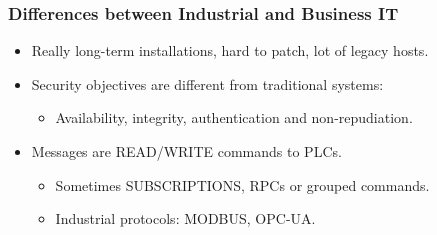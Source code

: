 \documentclass{beamer}
\newcommand{\cybersec}{cybersecurity\xspace}
\newcommand{\modbus}{MODBUS\xspace}
\newcommand{\opcua}{OPC-UA\xspace}
\begin{document}
\begin{frame}
    \frametitle{Differences between Industrial and Business IT}
    
    \begin{itemize}
        \item Really long-term installations, hard to patch, lot of legacy hosts.
            \vfill
        \item Security objectives are different from traditional systems:
        \begin{itemize}
            \item Availability, integrity, authentication and non-repudiation.%
        \end{itemize}
            \vfill
        \item Messages are READ/WRITE commands to PLCs.
        \begin{itemize}
            \item Sometimes SUBSCRIPTIONS, RPCs or grouped commands.
            \item Industrial protocols: \modbus, \opcua.
        \end{itemize}
    \end{itemize}
\end{frame}
\end{document}
